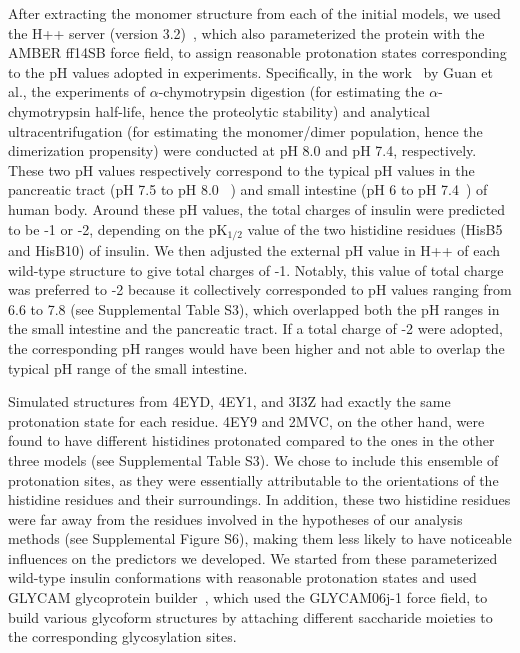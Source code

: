 \documentclass[9pt]{elife}
\begin{document}
After extracting the monomer structure from each of the initial models, we used the H++ server (version 3.2)~\cite{anandakrishnan2012h++, myers2006simple, gordon2005h++}, which also parameterized the protein with the AMBER ff14SB force field, to assign reasonable protonation states corresponding to the pH values adopted in experiments. Specifically, in the work~\cite{guan2018chemically} by Guan et al., the experiments of $\alpha$-chymotrypsin digestion (for estimating the $\alpha$-chymotrypsin half-life, hence the proteolytic stability) and analytical ultracentrifugation (for estimating the monomer/dimer population, hence the dimerization propensity) were conducted at pH 8.0 and pH 7.4, respectively. These two pH values respectively correspond to the typical pH values in the pancreatic tract (pH 7.5 to pH 8.0 ~\cite{mcqueen2017comprehensive}) and small intestine (pH 6 to pH 7.4~\cite{fallingborg1999intraluminal}) of human body. Around these pH values, the total charges of insulin were predicted to be -1 or -2,  depending on the pK$_{1/2}$ value of the two histidine residues (HisB5 and HisB10) of insulin. We then adjusted the external pH value in H++ of each wild-type structure to give total charges of -1. Notably, this value of total charge was preferred to -2 because it collectively corresponded to pH values ranging from 6.6 to 7.8 (see Supplemental Table S3), which overlapped both the pH ranges in the small intestine and the pancreatic tract. If a total charge of -2 were adopted, the corresponding pH ranges would have been higher and not able to overlap the typical pH range of the small intestine.

Simulated structures from 4EYD, 4EY1, and 3I3Z had exactly the same protonation state for each residue. 4EY9 and 2MVC, on the other hand, were found to have different histidines protonated compared to the ones in the other three models (see Supplemental Table S3).  We chose to include this ensemble of protonation sites, as they were essentially attributable to the orientations of the histidine residues and their surroundings. In addition, these two histidine residues were far away from the residues involved in the hypotheses of our analysis methods (see Supplemental Figure S6), making them less likely to have noticeable influences on the predictors we developed. We started from these parameterized wild-type insulin conformations with reasonable protonation states and used GLYCAM glycoprotein builder~\cite{kirschner2008glycam06}, which used the GLYCAM06j-1 force field, to build various glycoform structures by attaching different saccharide moieties to the corresponding glycosylation sites. 
\end{document}
